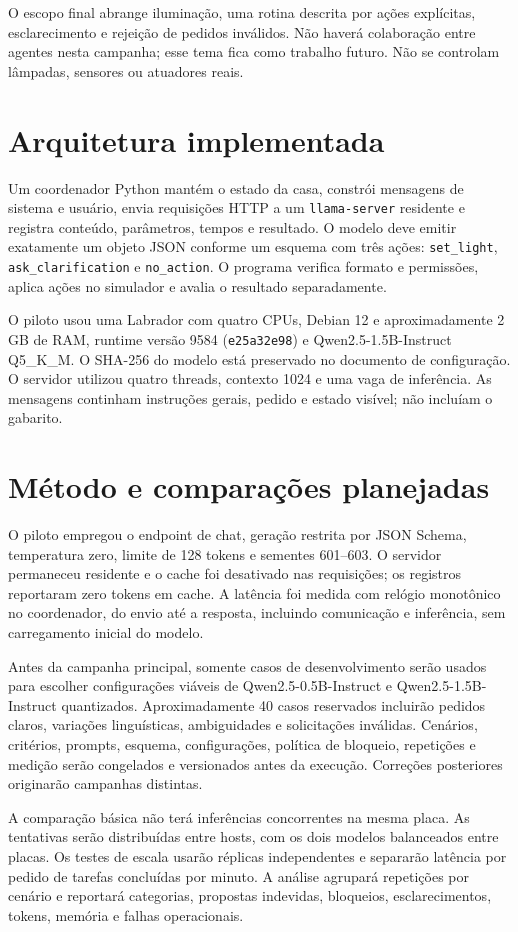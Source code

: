 \documentclass[letterpaper,conference]{IEEEtran}
\begin{document}
O escopo final abrange iluminação, uma rotina descrita por ações explícitas, esclarecimento e rejeição de pedidos inválidos. Não haverá colaboração entre agentes nesta campanha; esse tema fica como trabalho futuro. Não se controlam lâmpadas, sensores ou atuadores reais.
\section{Arquitetura implementada}
Um coordenador Python mantém o estado da casa, constrói mensagens de sistema e usuário, envia requisições HTTP a um \texttt{llama-server} residente e registra conteúdo, parâmetros, tempos e resultado. O modelo deve emitir exatamente um objeto JSON conforme um esquema com três ações: \texttt{set\_light}, \texttt{ask\_clarification} e \texttt{no\_action}. O programa verifica formato e permissões, aplica ações no simulador e avalia o resultado separadamente.

O piloto usou uma Labrador com quatro CPUs, Debian 12 e aproximadamente 2 GB de RAM, runtime versão 9584 (\texttt{e25a32e98}) e Qwen2.5-1.5B-Instruct Q5\_K\_M. O SHA-256 do modelo está preservado no documento de configuração. O servidor utilizou quatro threads, contexto 1024 e uma vaga de inferência. As mensagens continham instruções gerais, pedido e estado visível; não incluíam o gabarito.
\section{Método e comparações planejadas}
O piloto empregou o endpoint de chat, geração restrita por JSON Schema, temperatura zero, limite de 128 tokens e sementes 601--603. O servidor permaneceu residente e o cache foi desativado nas requisições; os registros reportaram zero tokens em cache. A latência foi medida com relógio monotônico no coordenador, do envio até a resposta, incluindo comunicação e inferência, sem carregamento inicial do modelo.

Antes da campanha principal, somente casos de desenvolvimento serão usados para escolher configurações viáveis de Qwen2.5-0.5B-Instruct e Qwen2.5-1.5B-Instruct quantizados. Aproximadamente 40 casos reservados incluirão pedidos claros, variações linguísticas, ambiguidades e solicitações inválidas. Cenários, critérios, prompts, esquema, configurações, política de bloqueio, repetições e medição serão congelados e versionados antes da execução. Correções posteriores originarão campanhas distintas.

A comparação básica não terá inferências concorrentes na mesma placa. As tentativas serão distribuídas entre hosts, com os dois modelos balanceados entre placas. Os testes de escala usarão réplicas independentes e separarão latência por pedido de tarefas concluídas por minuto. A análise agrupará repetições por cenário e reportará categorias, propostas indevidas, bloqueios, esclarecimentos, tokens, memória e falhas operacionais.
\end{document}
